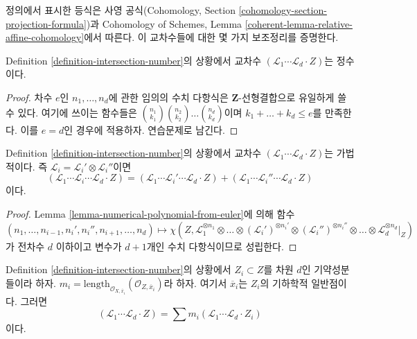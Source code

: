 \noindent
정의에서 표시한 등식은 사영 공식(Cohomology, Section
\ref{cohomology-section-projection-formula})과 Cohomology of Schemes, Lemma
\ref{coherent-lemma-relative-affine-cohomology}에서 따른다.
이 교차수들에 대한 몇 가지 보조정리를 증명한다.

\begin{lemma}
\label{lemma-intersection-number-integer}
Definition \ref{definition-intersection-number}의 상황에서 교차수
$(\mathcal{L}_1 \cdots \mathcal{L}_d \cdot Z)$는 정수이다.
\end{lemma}

\begin{proof}
차수 $e$인 $n_1, \ldots, n_d$에 관한 임의의 수치 다항식은
$\mathbf{Z}$-선형결합으로 유일하게 쓸 수 있다. 여기에 쓰이는 함수들은
${n_1 \choose k_1}{n_2 \choose k_2} \ldots {n_d \choose k_d}$이며
$k_1 + \ldots + k_d \leq e$를 만족한다. 이를 $e = d$인 경우에 적용하자.
연습문제로 남긴다.
\end{proof}

\begin{lemma}
\label{lemma-intersection-number-additive}
Definition \ref{definition-intersection-number}의 상황에서 교차수
$(\mathcal{L}_1 \cdots \mathcal{L}_d \cdot Z)$는 가법적이다. 즉
$\mathcal{L}_i = \mathcal{L}_i' \otimes \mathcal{L}_i''$이면
$$
(\mathcal{L}_1 \cdots \mathcal{L}_i \cdots \mathcal{L}_d \cdot Z) =
(\mathcal{L}_1 \cdots \mathcal{L}_i' \cdots \mathcal{L}_d \cdot Z) +
(\mathcal{L}_1 \cdots \mathcal{L}_i'' \cdots \mathcal{L}_d \cdot Z)
$$
이다.
\end{lemma}

\begin{proof}
Lemma \ref{lemma-numerical-polynomial-from-euler}에 의해 함수
$$
(n_1, \ldots, n_{i - 1}, n_i', n_i'', n_{i + 1}, \ldots, n_d)
\mapsto
\chi(Z, \mathcal{L}_1^{\otimes n_1} \otimes
\ldots \otimes (\mathcal{L}_i')^{\otimes n_i'} \otimes
(\mathcal{L}_i'')^{\otimes n_i''} \otimes \ldots \otimes
\mathcal{L}_d^{\otimes n_d}|_Z)
$$
가 전차수 $d$ 이하이고 변수가 $d + 1$개인 수치 다항식이므로 성립한다.
\end{proof}

\begin{lemma}
\label{lemma-intersection-number-in-terms-of-components}
Definition \ref{definition-intersection-number}의 상황에서
$Z_i \subset Z$를 차원 $d$인 기약성분들이라 하자.
$m_i = \text{length}_{\mathcal{O}_{X, \overline{x}_i}}
(\mathcal{O}_{Z, \overline{x}_i})$라 하자. 여기서 $\overline{x}_i$는
$Z_i$의 기하학적 일반점이다. 그러면
$$
(\mathcal{L}_1 \cdots \mathcal{L}_d \cdot Z) =
\sum m_i(\mathcal{L}_1 \cdots \mathcal{L}_d \cdot Z_i)
$$
이다.
\end{lemma}

